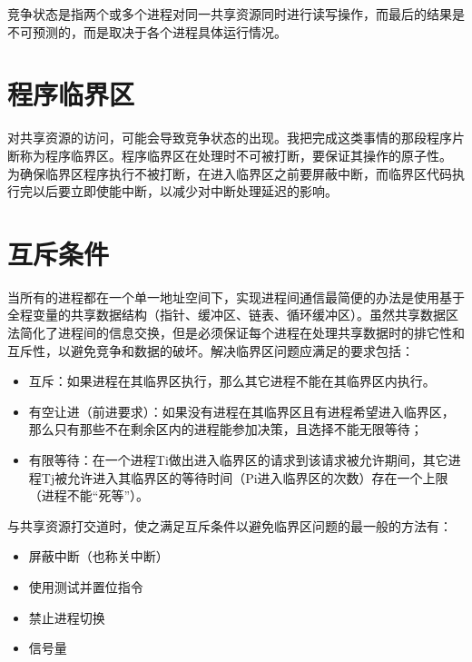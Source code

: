 \documentclass[a4paper,12pt]{report}
\begin{document}
\begin{appendix}
\begin{spacing}{1.5}
    竞争状态是指两个或多个进程对同一共享资源同时进行读写操作，而最后的结果是不可预测的，而是取决于各个进程具体运行情况。


\end{spacing}


\section{     程序临界区}
\begin{spacing}{1.5}
 对共享资源的访问，可能会导致竞争状态的出现。我把完成这类事情的那段程序片断称为程序临界区。程序临界区在处理时不可被打断，要保证其操作的原子性。 为确保临界区程序执行不被打断，在进入临界区之前要屏蔽中断，而临界区代码执行完以后要立即使能中断，以减少对中断处理延迟的影响。
\end{spacing}


\section{     互斥条件}
\begin{spacing}{1.5}
  当所有的进程都在一个单一地址空间下，实现进程间通信最简便的办法是使用基于全程变量的共享数据结构（指针、缓冲区、链表、循环缓冲区）。虽然共享数据区 法简化了进程间的信息交换，但是必须保证每个进程在处理共享数据时的排它性和互斥性，以避免竞争和数据的破坏。解决临界区问题应满足的要求包括：
  \begin{itemize}
    \item 	互斥：如果进程在其临界区执行，那么其它进程不能在其临界区内执行。
    \item 	有空让进（前进要求）：如果没有进程在其临界区且有进程希望进入临界区，那么只有那些不在剩余区内的进程能参加决策，且选择不能无限等待；
    \item 	有限等待：在一个进程Ti做出进入临界区的请求到该请求被允许期间，其它进程Tj被允许进入其临界区的等待时间（Pi进入临界区的次数）存在一个上限（进程不能“死等”）。
  \end{itemize}

    与共享资源打交道时，使之满足互斥条件以避免临界区问题的最一般的方法有：
      \begin{itemize}
    \item 		屏蔽中断（也称关中断）
    \item 	使用测试并置位指令
    \item 	禁止进程切换
    \item 	信号量


  \end{itemize}
\end{spacing}


\end{appendix}
\end{document}

